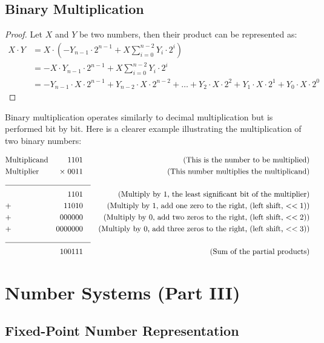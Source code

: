 \documentclass[12pt,openany, tikz,border=10pt]{book}
\begin{document}
\section{Binary Multiplication}

\begin{proof}[Proof]
    Let $X$ and $Y$ be two numbers, then their product can be represented as:
    \begin{align*}
    X \cdot Y &= X \cdot \left( -Y_{n-1} \cdot 2^{n-1} + X \sum_{i=0}^{n-2} Y_i \cdot 2^i \right) \\
    &= -X \cdot Y_{n-1} \cdot 2^{n-1} + X \sum_{i=0}^{n-2} Y_i \cdot 2^i \\
    &= -Y_{n-1} \cdot X \cdot 2^{n-1} + Y_{n-2} \cdot X \cdot 2^{n-2} + \ldots + Y_2 \cdot X \cdot 2^2 + Y_1 \cdot X \cdot 2^1 + Y_0 \cdot X \cdot 2^0
    \end{align*}
\end{proof}
    
  

\newpage
Binary multiplication operates similarly to decimal multiplication but is performed bit by bit. Here is a clearer example illustrating the multiplication of two binary numbers:

\begin{align*}
    & \text{Multiplicand} & 1101 & \quad & \text{(This is the number to be multiplied)}\\
    & \text{Multiplier} & \times \; 0011 & & \text{(This number multiplies the multiplicand)}\\
    \cline{2-4}
    && 1101 & & \text{(Multiply by 1, the least significant bit of the multiplier)}\\
    &+& 11010 & & \text{(Multiply by 1, add one zero to the right, (left shift, $<<1$))}\\
    &+& 000000 & & \text{(Multiply by 0, add two zeros to the right, (left shift, $<<2$))}\\
    &+& 0000000 & & \text{(Multiply by 0, add three zeros to the right, (left shift, $<<3$))}\\
    \cline{2-4}
    && 100111 & & \text{(Sum of the partial products)}
\end{align*}




\chapter{Number Systems (Part III)}
    \section{Fixed-Point
    Number Representation}  
\end{document}
